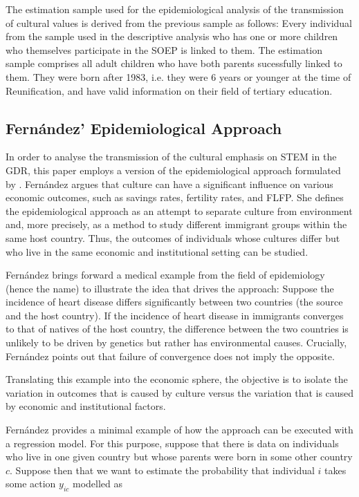 \documentclass[a4paper, oneside, hyperfootnotes = false]{article}
\begin{document}
{%
The estimation sample used for the epidemiological analysis of the transmission of cultural values is derived from the previous sample as follows:
Every individual from the sample used in the descriptive analysis who has one or more children who themselves participate in the SOEP is linked to them.
The estimation sample comprises all adult children who have both parents sucessfully linked to them.
They were born after 1983, i.e. they were 6 years or younger at the time of Reunification, and have valid information on their field of tertiary education.

\subsection{Fernández' Epidemiological Approach}
\label{epid}

In order to analyse the transmission of the cultural emphasis on STEM in the GDR, this paper employs a version of the epidemiological approach formulated by \cite{Fernandez2011}.
Fernández argues that culture can have a significant influence on various economic outcomes, such as savings rates, fertility rates, and FLFP.
She defines the epidemiological approach as an attempt to separate culture from environment and, more precisely, as a method to study different immigrant groups within the same host country. %
Thus, the outcomes of individuals whose cultures differ but who live in the same economic and institutional setting can be studied.

Fernández brings forward a medical example from the field of epidemiology (hence the name) to illustrate the idea that drives the approach:
Suppose the incidence of heart disease differs significantly between two countries (the source and the host country).
If the incidence of heart disease in immigrants converges to that of natives of the host country, the difference between the two countries is unlikely to be driven by genetics but rather has environmental causes.
Crucially, Fernández points out that failure of convergence does not imply the opposite.

Translating this example into the economic sphere, the objective is to isolate the variation in outcomes that is caused by culture versus the variation that is caused by economic and institutional factors.

Fernández provides a minimal example of how the approach can be executed with a regression model.
For this purpose, suppose that there is data on individuals who live in one given country but whose parents were born in some other country $c$.
Suppose then that we want to estimate the probability that individual $i$ takes some action $y_{ic}$ modelled as

}
\end{document}
